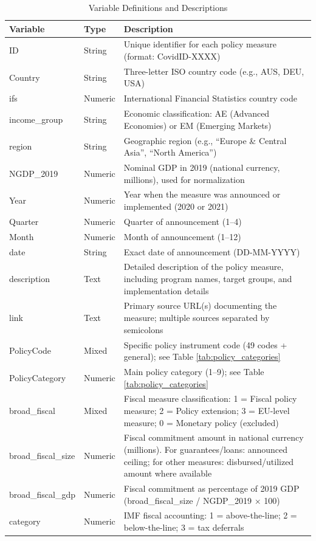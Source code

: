 \documentclass[12pt]{article}
\begin{document}
\begin{table}[H]
\caption{Variable Definitions and Descriptions}
\label{tab:variables}
\scriptsize
\begin{threeparttable}
\begin{tabular}{@{}p{3cm}p{2cm}p{12cm}@{}}
\toprule
\textbf{Variable} & \textbf{Type} & \textbf{Description} \\
\midrule
ID & String & Unique identifier for each policy measure (format: CovidID-XXXX) \\
\addlinespace
Country & String & Three-letter ISO country code (e.g., AUS, DEU, USA) \\
\addlinespace
ifs & Numeric & International Financial Statistics country code \\
\addlinespace
income\_group & String & Economic classification: AE (Advanced Economies) or EM (Emerging Markets) \\
\addlinespace
region & String & Geographic region (e.g., ``Europe \& Central Asia'', ``North America'') \\
\addlinespace
NGDP\_2019 & Numeric & Nominal GDP in 2019 (national currency, millions), used for normalization \\
\addlinespace
Year & Numeric & Year when the measure was announced or implemented (2020 or 2021) \\
\addlinespace
Quarter & Numeric & Quarter of announcement (1--4) \\
\addlinespace
Month & Numeric & Month of announcement (1--12) \\
\addlinespace
date & String & Exact date of announcement (DD-MM-YYYY) \\
\addlinespace
description & Text & Detailed description of the policy measure, including program names, target groups, and implementation details \\
\addlinespace
link & Text & Primary source URL(s) documenting the measure; multiple sources separated by semicolons \\
\addlinespace
PolicyCode & Mixed & Specific policy instrument code (49 codes + general); see Table \ref{tab:policy_categories} \\
\addlinespace
PolicyCategory & Numeric & Main policy category (1--9); see Table \ref{tab:policy_categories} \\
\addlinespace
broad\_fiscal & Mixed & Fiscal measure classification: 1 = Fiscal policy measure; 2 = Policy extension; 3 = EU-level measure; 0 = Monetary policy (excluded) \\
\addlinespace
broad\_fiscal\_size & Numeric & Fiscal commitment amount in national currency (millions). For guarantees/loans: announced ceiling; for other measures: disbursed/utilized amount where available \\
\addlinespace
broad\_fiscal\_gdp & Numeric & Fiscal commitment as percentage of 2019 GDP (broad\_fiscal\_size / NGDP\_2019 $\times$ 100) \\
\addlinespace
category & Numeric & IMF fiscal accounting: 1 = above-the-line; 2 = below-the-line; 3 = tax deferrals \\
\bottomrule
\end{tabular}
\end{threeparttable}
\end{table}
\end{document}

